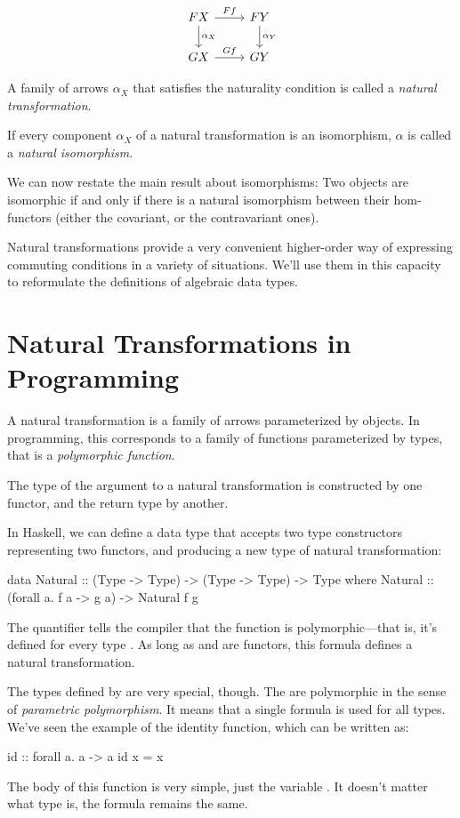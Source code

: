 \documentclass[DaoFP]{subfiles}
\begin{document}
\[
 \begin{tikzcd}
 F X
 \arrow[d, "\alpha_X"]
 \arrow[r, "F f"]
 &
F Y
  \arrow[d, "\alpha_Y"]
 \\
G X
 \arrow[r, "G f"]
& G Y
 \end{tikzcd}
\]

A family of arrows $\alpha_X$ that satisfies the naturality condition is called a \emph{natural transformation}. 

If every component $\alpha_X$ of a natural transformation is an isomorphism, $\alpha$ is called a \emph{natural isomorphism}. 

We can now restate the main result about isomorphisms: Two objects are isomorphic if and only if there is a natural isomorphism between their hom-functors (either the covariant, or the contravariant ones).

Natural transformations provide a very convenient higher-order way of expressing commuting conditions in a variety of situations. We'll use them in this capacity to reformulate the definitions of algebraic data types.

\section{Natural Transformations in Programming}

A natural transformation is a family of arrows parameterized by objects. In programming, this corresponds to a family of functions parameterized by types, that is a \emph{polymorphic function}. 

The type of the argument to a natural transformation is constructed by one functor, and the return type by another. 

In Haskell, we can define a data type that accepts two type constructors representing two functors, and producing a new type of natural transformation:

\begin{haskell}
data Natural :: (Type -> Type) -> (Type -> Type) -> Type where
  Natural :: (forall a. f a -> g a) -> Natural f g
\end{haskell}
The  quantifier tells the compiler that the function is polymorphic---that is, it's defined for every type . As long as  and  are functors, this formula defines a natural transformation. 

The types defined by  are very special, though. The are polymorphic in the sense of \emph{parametric polymorphism}. It means that a single formula is used for all types. We've seen the example of the identity function, which can be written as:
\begin{haskell}
id :: forall a. a -> a
id x = x
\end{haskell}
The body of this function is very simple, just the variable . It doesn't matter what type  is, the formula remains the same.
\end{document}
